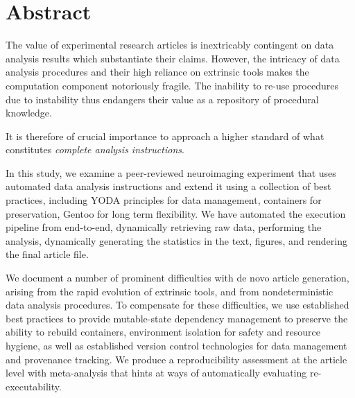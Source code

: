\section{Abstract}

The value of experimental research articles is inextricably contingent on data analysis results which substantiate their claims.
However, the intricacy of data analysis procedures and their high reliance on extrinsic tools makes the computation component notoriously fragile.
The inability to re-use procedures due to instability thus endangers their value as a repository of procedural knowledge.

It is therefore of crucial importance to approach a higher standard of what constitutes \textit{complete analysis instructions}.

In this study, we examine a peer-reviewed neuroimaging experiment that uses automated data analysis instructions and extend it using a collection of best practices, including YODA principles for data management, containers for preservation, Gentoo for long term flexibility.
We have automated the execution pipeline from end-to-end, dynamically retrieving raw data, performing the analysis, dynamically generating the statistics in the text, figures, and rendering the final article file.

We document a number of prominent difficulties with de novo article generation, arising from the rapid evolution of extrinsic tools, and from nondeterministic data analysis procedures.
To compensate for these difficulties, we use established best practices to provide mutable-state dependency management to preserve the ability to rebuild containers, environment isolation for safety and resource hygiene, as well as established version control technologies for data management and provenance tracking.
We produce a reproducibility assessment at the article level with meta-analysis that hints at ways of automatically evaluating re-executability.

